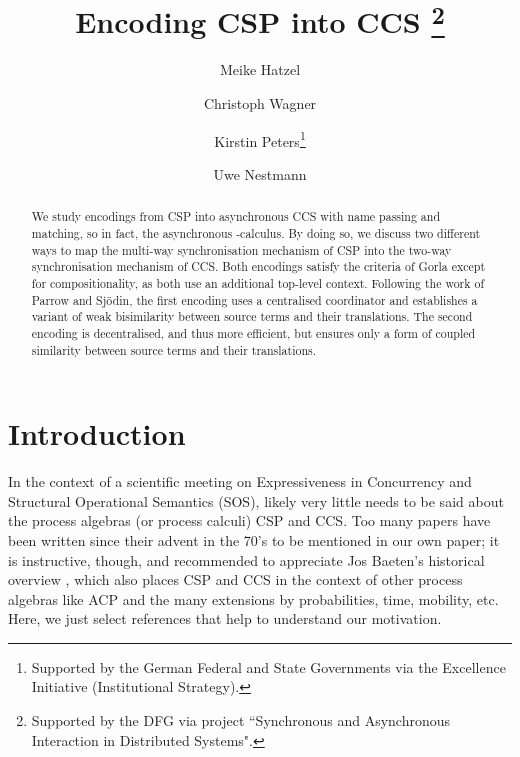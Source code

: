 \documentclass[copyright,creativecommons]{eptcs}
\title{Encoding CSP into CCS
	\thanks{Supported by the DFG via project ``Synchronous and Asynchronous Interaction in Distributed Systems".}}
\author{Meike Hatzel 
	\institute{TU Berlin}
	\and Christoph Wagner
	\institute{TU Berlin}
	\and Kirstin Peters\thanks{Supported by the German Federal and State Governments via the Excellence Initiative (Institutional Strategy).}
	\institute{TU Dresden}
	\and Uwe Nestmann
	\institute{TU Berlin}
}
\begin{document}
\maketitle

\begin{abstract}
	We study encodings from CSP into asynchronous CCS with name passing and matching, so in fact, the asynchronous -calculus. By doing so, we discuss two different ways to map the multi-way synchronisation mechanism of CSP into the two-way synchronisation mechanism of CCS. Both encodings satisfy the criteria of Gorla except for compositionality, as both use an additional top-level context. Following the work of Parrow and Sjödin, the first encoding uses a centralised coordinator and establishes a variant of weak bisimilarity between source terms and their translations. The second encoding is decentralised, and thus more efficient, but ensures only a form of coupled similarity between source terms and their translations.
\end{abstract}


\section{Introduction}

In the context of a scientific meeting on Expressiveness in Concurrency and Structural Operational Semantics (SOS), likely very little needs to be said about the process algebras (or process calculi) CSP and CCS. Too many papers have been written since their advent in the 70's to be mentioned in our own paper; it is instructive, though, and recommended to appreciate Jos Baeten's historical overview \cite{Baeten:2005:BHP:1085667.1085669}, which also places CSP and CCS in the context of other process algebras like ACP and the many extensions by probabilities, time, mobility, etc. Here, we just select references that help to understand our motivation.
\end{document}
